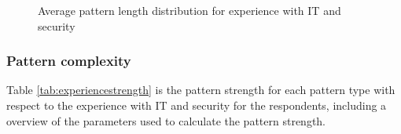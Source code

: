       \begin{figure}[H]
        \centering
        \caption{Average pattern length distribution for experience with IT and security}
        \label{fig:avgpatterndistexperience}
      \end{figure}

    \subsubsection{Pattern complexity}

      Table \ref{tab:experiencestrength} is the pattern strength for each pattern type with respect to the experience with IT and security for the respondents, including a overview of the parameters used to calculate the pattern strength. 
 





